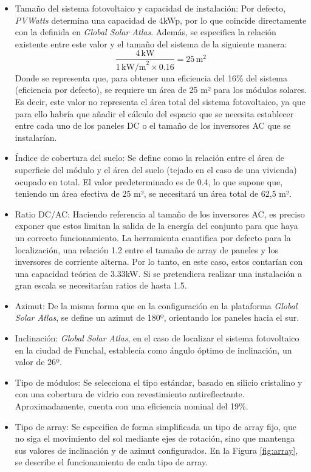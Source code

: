 \begin{itemize}
    \item Tamaño del sistema fotovoltaico y capacidad de instalación: Por defecto, \textit{PVWatts} determina una capacidad de 4kWp, por lo que coincide directamente con la definida en \textit{Global Solar Atlas}. Además, se especifica la relación existente entre este valor y el tamaño del sistema de la siguiente manera:
    \[\frac{4 \, \text{kW}}{1 \, \text{kW/m}^2 \times 0.16} = 25 \, \text{m}^2\]
    Donde se representa que, para obtener una eficiencia del 16\% del sistema (eficiencia por defecto), se requiere un área de 25 m² para los módulos solares. Es decir, este valor no representa el área total del sistema fotovoltaico, ya que para ello habría que añadir el cálculo del espacio que se necesita establecer entre cada uno de los paneles DC o el tamaño de los inversores AC que se instalarían.
    \item Índice de cobertura del suelo: Se define como la relación entre el área de superficie del módulo y el área del suelo (tejado en el caso de una vivienda) ocupado en total. El valor predeterminado es de 0.4, lo que supone que, teniendo un área efectiva de 25 m², se necesitará un área total de 62,5 m².
    \item Ratio DC/AC: Haciendo referencia al tamaño de los inversores AC, es preciso exponer que estos limitan la salida de la energía del conjunto para que haya un correcto funcionamiento. La herramienta cuantifica por defecto para la localización, una relación 1.2 entre el tamaño de array de paneles y los inversores de corriente alterna. Por lo tanto, en este caso, estos contarían con una capacidad teórica de 3.33kW. Si se pretendiera realizar una instalación a gran escala se necesitarían ratios de hasta 1.5.
    \item Azimut: De la misma forma que en la configuración en la plataforma \textit{Global Solar Atlas}, se define un azimut de 180º, orientando los paneles hacia el sur.
    \item Inclinación: \textit{Global Solar Atlas}, en el caso de localizar el sistema fotovoltaico en la ciudad de Funchal, establecía como ángulo óptimo de inclinación, un valor de 26º.
    \item Tipo de módulos: Se selecciona el tipo estándar, basado en silicio cristalino y con una cobertura de vidrio con revestimiento antireflectante. Aproximadamente, cuenta con una eficiencia nominal del 19\%.
    \item Tipo de array: Se especifica de forma simplificada un tipo de array fijo, que no siga el movimiento del sol mediante ejes de rotación, sino que mantenga sus valores de inclinación y de azimut configurados. En la Figura \ref{fig:array}, se describe el funcionamiento de cada tipo de array.
\end{itemize}


